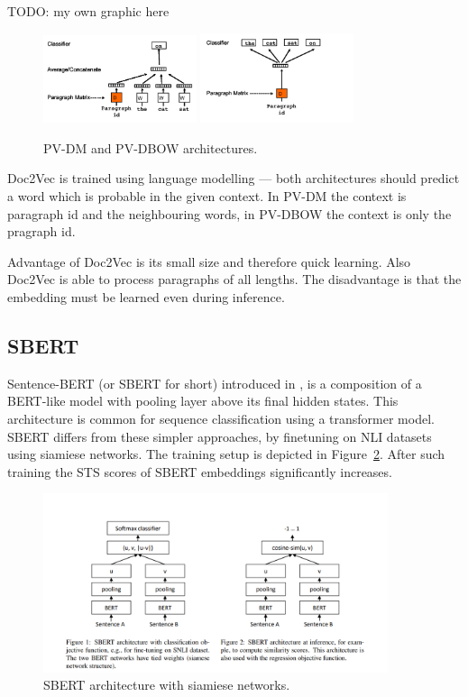 TODO: my own graphic here

\begin{figure}[h]
    \centering
    \includegraphics[width=0.4\textwidth]{./img/pv-dm.png}
    \includegraphics[width=0.4\textwidth]{./img/pv-dbow.png}
    \caption{PV-DM and PV-DBOW architectures.\label{fig:pv-dm_pv-dbow}}
\end{figure}

Doc2Vec is trained using language modelling --- both architectures should
predict a word which is probable in the given context. In PV-DM the context is
paragraph id and the neighbouring words, in PV-DBOW the context is only the
pragraph id.

Advantage of Doc2Vec is its small size and therefore quick learning. Also
Doc2Vec is able to process paragraphs of all lengths. The disadvantage is
that the embedding must be learned even during inference.

\subsection{SBERT}

Sentence-BERT (or SBERT for short) introduced in \cite{reimers2019sentence}, is
a composition of a BERT-like model with pooling layer above its final hidden
states. This architecture is common for sequence classification using a
transformer model. SBERT differs from these simpler approaches, by finetuning on
NLI datasets using siamiese networks. The training setup is depicted in
Figure~\ref{fig:sbert_siemese}. After such training the STS scores of SBERT
embeddings significantly increases.

\begin{figure}
    \centering
    \includegraphics[width=0.9\textwidth]{./img/sbert_pairs_architectures.png}
    \caption{SBERT architecture with siamiese
    networks.\label{fig:sbert_siemese}}
\end{figure}

